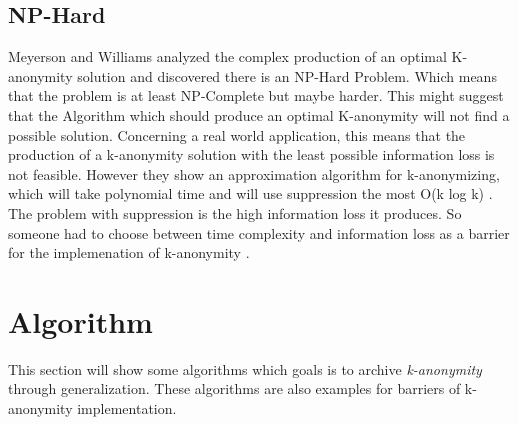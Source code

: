 \documentclass{llncs}
\begin{document}
\subsection{NP-Hard}
Meyerson and Williams analyzed the complex production of an optimal K-anonymity solution and discovered there is an NP-Hard Problem. Which means that the problem is at least NP-Complete but maybe harder. This might suggest that the Algorithm which should produce an optimal K-anonymity will not find a possible solution. Concerning a real world application, this means that the production of a k-anonymity solution with the least possible information loss is not feasible. However they show an approximation algorithm for k-anonymizing, which will take polynomial time and will use suppression the most O(k log k)  \cite{sweeney2002k}. The problem with suppression is the high information loss it produces. So someone had to choose between time complexity and information loss as a barrier for the implemenation of k-anonymity \cite{el2009globally}. 



\section{Algorithm}
This section will show some algorithms which goals is to archive \textit{k-anonymity} through generalization. These algorithms are also examples for barriers of k-anonymity implementation. 
\end{document}
